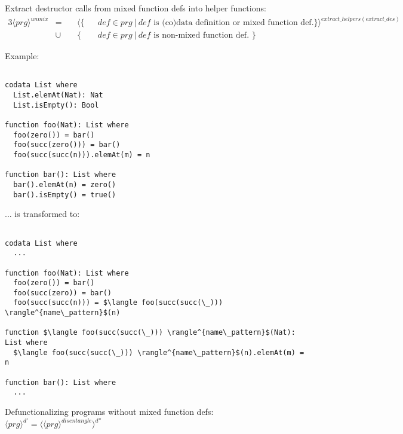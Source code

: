 \documentclass[11pt]{article} %
\begin{document}
Extract destructor calls from mixed function defs into helper functions:
\begin{alignat*}{3}
\langle prg \rangle^{unmix} & = ~&& \langle \{ && def \in prg ~ | ~ def \textrm{ is (co)data definition or mixed function def.} \} \rangle^{extract\_helpers(extract\_des)} \\
&\cup && \{ && def \in prg ~ | ~ def \textrm{ is non-mixed function def. } \}
\end{alignat*}

Example:

\begin{lstlisting}  

codata List where
  List.elemAt(Nat): Nat
  List.isEmpty(): Bool

function foo(Nat): List where
  foo(zero()) = bar()
  foo(succ(zero())) = bar()
  foo(succ(succ(n))).elemAt(m) = n

function bar(): List where
  bar().elemAt(n) = zero()
  bar().isEmpty() = true()

\end{lstlisting}

... is transformed to:

\begin{lstlisting}[mathescape]

codata List where
  ...

function foo(Nat): List where
  foo(zero()) = bar()
  foo(succ(zero)) = bar()
  foo(succ(succ(n))) = $\langle foo(succ(succ(\_))) \rangle^{name\_pattern}$(n)

function $\langle foo(succ(succ(\_))) \rangle^{name\_pattern}$(Nat): List where
  $\langle foo(succ(succ(\_))) \rangle^{name\_pattern}$(n).elemAt(m) = n

function bar(): List where
  ...

\end{lstlisting}

Defunctionalizing programs without mixed function defs: $\langle prg \rangle^{d'} = \langle \langle prg \rangle^{disentangle} \rangle^{d''}$
\end{document}

